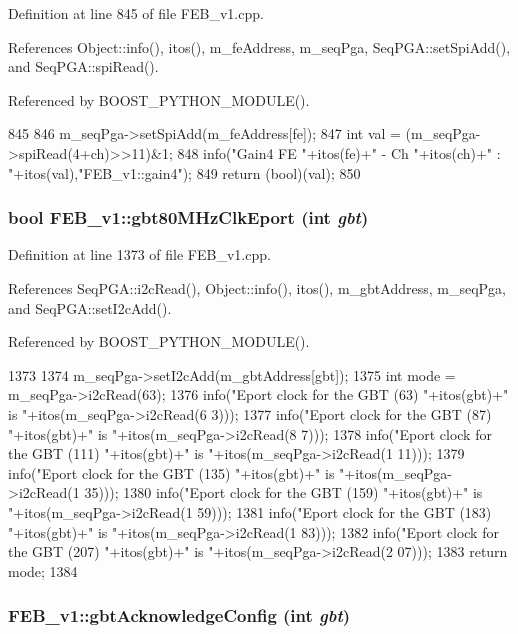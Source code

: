 Definition at line 845 of file FEB\_\-v1.cpp.

References Object::info(), itos(), m\_\-feAddress, m\_\-seqPga, SeqPGA::setSpiAdd(), and SeqPGA::spiRead().

Referenced by BOOST\_\-PYTHON\_\-MODULE().


\begin{DoxyCode}
845                                    {
846   m_seqPga->setSpiAdd(m_feAddress[fe]);
847   int val = (m_seqPga->spiRead(4+ch)>>11)&1;
848   info("Gain4 FE "+itos(fe)+" - Ch "+itos(ch)+" : "+itos(val),"FEB_v1::gain4");
849   return (bool)(val);
850 }
\end{DoxyCode}
\hypertarget{classFEB__v1_ac22b1ffdc20be66330a66ebd12cd13f1}{
\subsubsection[{gbt80MHzClkEport}]{\setlength{\rightskip}{0pt plus 5cm}bool FEB\_\-v1::gbt80MHzClkEport (int {\em gbt})}}
\label{classFEB__v1_ac22b1ffdc20be66330a66ebd12cd13f1}


Definition at line 1373 of file FEB\_\-v1.cpp.

References SeqPGA::i2cRead(), Object::info(), itos(), m\_\-gbtAddress, m\_\-seqPga, and SeqPGA::setI2cAdd().

Referenced by BOOST\_\-PYTHON\_\-MODULE().


\begin{DoxyCode}
1373                                       {
1374   m_seqPga->setI2cAdd(m_gbtAddress[gbt]);
1375   int mode = m_seqPga->i2cRead(63);
1376   info("Eport clock for the GBT (63)  "+itos(gbt)+" is "+itos(m_seqPga->i2cRead(6
      3)));
1377   info("Eport clock for the GBT (87)  "+itos(gbt)+" is "+itos(m_seqPga->i2cRead(8
      7)));
1378   info("Eport clock for the GBT (111) "+itos(gbt)+" is "+itos(m_seqPga->i2cRead(1
      11)));
1379   info("Eport clock for the GBT (135) "+itos(gbt)+" is "+itos(m_seqPga->i2cRead(1
      35)));
1380   info("Eport clock for the GBT (159) "+itos(gbt)+" is "+itos(m_seqPga->i2cRead(1
      59)));
1381   info("Eport clock for the GBT (183) "+itos(gbt)+" is "+itos(m_seqPga->i2cRead(1
      83)));
1382   info("Eport clock for the GBT (207) "+itos(gbt)+" is "+itos(m_seqPga->i2cRead(2
      07)));
1383   return mode; 
1384 }
\end{DoxyCode}
\hypertarget{classFEB__v1_af7e7f3cb7269dc811866bc42585cf020}{
\subsubsection[{gbtAcknowledgeConfig}]{ FEB\_\-v1::gbtAcknowledgeConfig (int {\em gbt})}}
\label{classFEB__v1_af7e7f3cb7269dc811866bc42585cf020}


